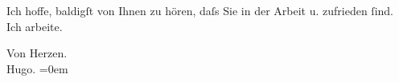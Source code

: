 \pstart
           Ich hoffe, baldigſt von Ihnen zu hören, daſs Sie in der Arbeit u. zufrieden{ }ſind. Ich
               arbeite.\pend
           
\pstart
           Von Herzen.{\\[\baselineskip]}\spacefill\mbox{Hugo.}\pend
           \leftskip=0em{}\endnumbering{}  \newcommand{\dateiname}{L01776}\newcommand{\titel}{Hugo von Hofmannsthal an Arthur Schnitzler, [11. oder 12]. 6. 1908}\newcommand{\editorInnen}{Martin Anton Müller und Gerd-Hermann Susen}
